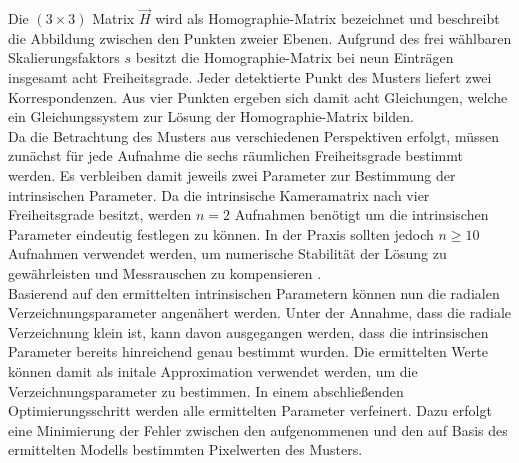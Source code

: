 

Die $(3 \times 3)$ Matrix $\vec{H}$ wird als Homographie-Matrix bezeichnet und beschreibt die Abbildung zwischen den Punkten zweier Ebenen. Aufgrund des frei wählbaren Skalierungsfaktors $s$ besitzt die Homographie-Matrix bei neun Einträgen insgesamt acht Freiheitsgrade. Jeder detektierte Punkt des Musters liefert zwei Korrespondenzen. Aus vier Punkten ergeben sich damit acht Gleichungen, welche ein Gleichungssystem zur Lösung der Homographie-Matrix bilden.\\

Da die Betrachtung des Musters aus verschiedenen Perspektiven erfolgt, müssen zunächst für jede Aufnahme die sechs räumlichen Freiheitsgrade bestimmt werden. Es verbleiben damit jeweils zwei Parameter zur Bestimmung der intrinsischen Parameter. Da die intrinsische Kameramatrix nach  vier Freiheitsgrade besitzt, werden $n = 2$ Aufnahmen benötigt um die intrinsischen Parameter eindeutig festlegen zu können. In der Praxis sollten jedoch $n \geq 10$ Aufnahmen verwendet werden, um numerische Stabilität der Lösung zu gewährleisten und Messrauschen zu kompensieren \cite{Bradsky2008}.\\


Basierend auf den ermittelten intrinsischen Parametern können nun die radialen Verzeichnungsparameter angenähert werden. Unter der Annahme, dass die radiale Verzeichnung klein ist, kann davon ausgegangen werden, dass die intrinsischen Parameter bereits hinreichend genau bestimmt wurden. Die ermittelten Werte können damit als initale Approximation verwendet werden, um die Verzeichnungsparameter zu bestimmen. In einem abschließenden Optimierungsschritt werden alle ermittelten Parameter verfeinert. Dazu erfolgt eine Minimierung der Fehler zwischen den aufgenommenen und den auf Basis des ermittelten Modells bestimmten Pixelwerten des Musters.

